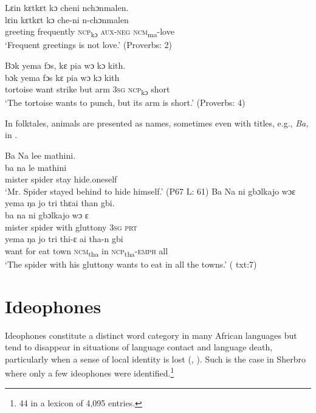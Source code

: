 \ea%
\label{ex:74}
\ea \label{ex:74a} Lɛin kɛtkɛt kɔ cheni   nchɔnmalen.\\
\gll lɛin    kɛtkɛt      kɔ      che-ni    n-chɔnmalen\\
  greeting  frequently  \textsc{ncp}\textsubscript{kɔ}    \textsc{aux-neg}  \textsc{ncm}\textsubscript{ma}{}-love\\
  \glt ‘Frequent greetings is not love.' (Proverbs: 2)

  \ex \label{ex:74b} Bɔk yema fɔs, kɛ pia wɔ kɔ kith.\\
  \gll bɔk    yema    fɔs      kɛ    pia  wɔ    kɔ      kith\\
  tortoise  want    strike    but  arm  \textsc{3sg}  \textsc{ncp}\textsubscript{kɔ}    short\\
 \glt ‘The tortoise wants to punch, but its arm is short.' (Proverbs: 4)
\z
\z

\largerpage
In folktales, animals are presented as names, sometimes even with titles, e.g., \textit{Ba,} in .

\ea%
    \label{ex:75}
    \ea Ba Na lee mathini.\\
    \gll ba      na      le    mathini\\
    mister  spider  stay  hide.oneself\\
   \glt ‘Mr. Spider\footnotemark{} stayed behind to hide himself.' (P67 L: 61)
  \ex Ba  Na ni gbɔlkajo wɔɛ yema ŋa jo tri thɛai than gbi.\\
    \gll ba      na      ni    gbɔlkajo    wɔ    ɛ\\
    mister  spider  with  gluttony    \textsc{3sg}  \textsc{prt}\\
    \gll yema    ŋa    jo    tri    thi-ɛ    ai    tha-n        gbi\\
    want    for    eat    town  \textsc{ncm}\textsubscript{tha}  in    \textsc{ncp}\textsubscript{tha}{}-\textsc{emph}  all\\
  \glt ‘The spider with his gluttony wants to eat in all the towns.' (\citealt{Sumner1921} txt:7)
\z
\z


\section{Ideophones}
\label{sec:3.5}\hypertarget{Toc115517769}{}
Ideophones constitute a distinct word category in many African languages but tend to disappear in situations of language contact and language death, particularly when a sense of local identity is lost (\citealt{Childs1994}, \citealt{Childs1998}). Such is the case in Sherbro where only a few ideophones were identified.\footnote{44 in a lexicon of 4,095 entries.}

